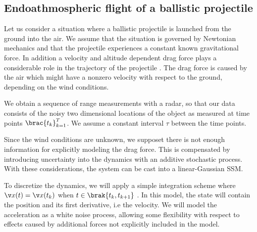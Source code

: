 \clearpage

\subsection{Endoathmospheric flight of a ballistic projectile}\label{sec:ballistic}
Let us consider a situation where a ballistic projectile is launched
from the ground into the air. We assume that the situation is governed by Newtonian
mechanics and that the projectile experiences a constant known gravitational
force. In addition a velocity and altitude dependent drag force plays
a considerable role in the trajectory of the projectile \parencite{ristic2004beyond}. 
The drag force is caused by the air which might have a nonzero velocity with respect to the ground,
depending on the wind conditions.
 
We obtain a sequence of range measurements with a radar,
so that our data consists of the noisy two dimensional locations 
of the object as measured at time points $\brac{t_k}_{k=1}^T$.
We assume a constant interval $\tau$ between the time points.

Since the wind conditions are unknown, we supposet there is not
enough information for explicitly modeling the drag force. 
This is compensated by introducing
uncertainty into the dynamics with an additive stochastic process.
With these considerations, the system can be cast into a linear-Gaussian
SSM. 


To discretize the dynamics, we will apply a simple integration scheme where 
$\x(t)=\x(t_k)$ when $t\in\brak{t_k,t_{k+1}}$ \parencite{bar2004estimation}.
In this model, the state will contain the position and
its first derivative, i.e the velocity. We will model the acceleration as a white noise
process, allowing some flexibility with respect to effects caused by additional forces not explicitly
included in the model.

